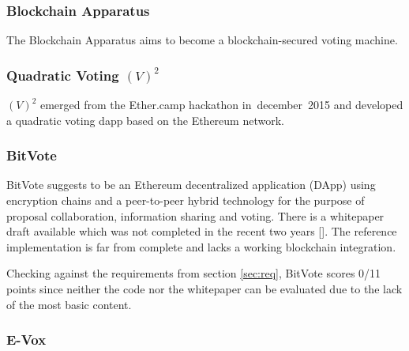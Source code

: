 \subsubsection{Blockchain Apparatus}
The Blockchain Apparatus aims to become a blockchain-secured voting machine.

\subsubsection{Quadratic Voting $(V)^2$}
$(V)^2$ emerged from the Ether.camp hackathon in~december~2015 and developed a quadratic voting dapp based on the Ethereum network.


\subsubsection{BitVote}
BitVote suggests to be an Ethereum decentralized application (DApp) using encryption chains and a peer-to-peer hybrid technology for the purpose of proposal collaboration, information sharing and voting. There is a whitepaper draft available which was not completed in the recent two years [\cite{BALE2014}]. The reference implementation is far from complete and lacks a working blockchain integration.\par
Checking against the requirements from section \ref{sec:req}, BitVote scores 0/11 points since neither the code nor the whitepaper can be evaluated due to the lack of the most basic content.


\subsubsection{E-Vox}

